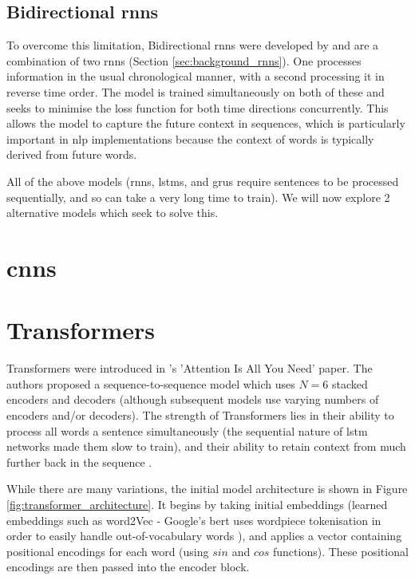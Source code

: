 \subsection{Bidirectional \acrlong{rnn}s}
\label{sec:background_bidirectional_rnns}
To overcome this limitation, Bidirectional \acrshort{rnn}s were developed by \citet{Schuster} and are a combination of two \acrshort{rnn}s (Section \ref{sec:background_rnns}). One processes information in the usual chronological manner, with a second processing it in reverse time order. The model is trained simultaneously on both of these and seeks to minimise the loss function for both time directions concurrently. This allows the model to capture the future context in sequences, which is particularly important in \acrshort{nlp} implementations because the context of words is typically derived from future words.

All of the above models (\acrshort{rnn}s, \acrshort{lstm}s, and \acrshort{gru}s require sentences to be processed sequentially, and so can take a very long time to train). We will now explore 2 alternative models which seek to solve this.

\section{\acrlong{cnn}s}
\label{sec:background_cnns}


\section{Transformers}
\label{sec:background_transformers}
Transformers were introduced in \citeauthor{vaswani2017attention}'s 'Attention Is All You Need' paper. The authors proposed a sequence-to-sequence model which uses $N=6$ stacked encoders and decoders (although subsequent models use varying numbers of encoders and/or decoders). The strength of Transformers lies in their ability to process all words a sentence simultaneously (the sequential nature of \acrshort{lstm} networks made them slow to train), and their ability to retain context from much further back in the sequence \cite{vaswani2017attention}.

While there are many variations, the initial model architecture is shown in Figure \ref{fig:transformer_architecture}. It begins by taking initial embeddings (learned embeddings such as word2Vec - Google's \acrshort{bert} uses wordpiece tokenisation in order to easily handle out-of-vocabulary words \citep{wu2016googles}), and applies a vector containing positional encodings for each word (using $sin$ and $cos$ functions). These positional encodings are then passed into the encoder block.

